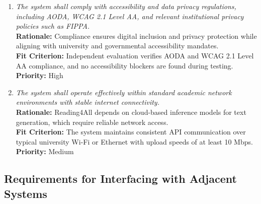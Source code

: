\documentclass[12pt]{article}
\begin{document}
\begin{enumerate}[label=OER-WE\arabic*., wide=0pt, leftmargin=*]
  \item \emph{The system shall comply with accessibility and data
      privacy regulations, including AODA, WCAG 2.1 Level AA, and
    relevant institutional privacy policies such as FIPPA.}\\[2mm]
    {\bf Rationale:} Compliance ensures digital inclusion and privacy
    protection while aligning with university and governmental
    accessibility mandates.\\
    {\bf Fit Criterion:} Independent evaluation verifies AODA and
    WCAG 2.1 Level AA compliance, and no accessibility blockers are
    found during testing.\\
    {\bf Priority:} High

  \item \emph{The system shall operate effectively within standard
    academic network environments with stable internet connectivity.}\\[2mm]
    {\bf Rationale:} Reading4All depends on cloud-based inference
    models for text generation, which require reliable network access.\\
    {\bf Fit Criterion:} The system maintains consistent API
    communication over typical university Wi-Fi or Ethernet with
    upload speeds of at least 10 Mbps.\\
    {\bf Priority:} Medium
\end{enumerate}

\subsection{Requirements for Interfacing with Adjacent Systems}
\end{document}
